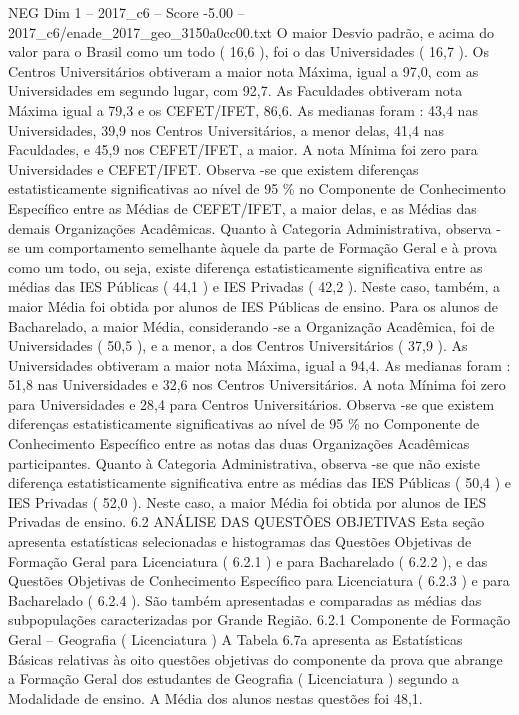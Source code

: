 \begin{textsample}{NEG Dim 1 – 2017\_c6 – Score -5.00 – 2017\_c6/enade\_2017\_geo\_3150a0cc00.txt}
O maior Desvio padrão, e acima do valor para o Brasil como um todo ( 16,6 ), foi o das Universidades ( 16,7 ).
Os Centros Universitários obtiveram a maior nota Máxima, igual a 97,0, com as Universidades em segundo lugar, com 92,7.
As Faculdades obtiveram nota Máxima igual a 79,3 e os CEFET/IFET, 86,6.
As medianas foram : 43,4 nas Universidades, 39,9 nos Centros Universitários, a menor delas, 41,4 nas Faculdades, e 45,9 nos CEFET/IFET, a maior.
A nota Mínima foi zero para Universidades e CEFET/IFET.
Observa -se que existem diferenças estatisticamente significativas ao nível de 95 \% no Componente de Conhecimento Específico entre as Médias de CEFET/IFET, a maior delas, e as Médias das demais Organizações Acadêmicas.
Quanto à Categoria Administrativa, observa -se um comportamento semelhante àquele da parte de Formação Geral e à prova como um todo, ou seja, existe diferença estatisticamente significativa entre as médias das IES Públicas ( 44,1 ) e IES Privadas ( 42,2 ).
Neste caso, também, a maior Média foi obtida por alunos de IES Públicas de ensino.
Para os alunos de Bacharelado, a maior Média, considerando -se a Organização Acadêmica, foi de Universidades ( 50,5 ), e a menor, a dos Centros Universitários ( 37,9 ).
As Universidades obtiveram a maior nota Máxima, igual a 94,4.
As medianas foram : 51,8 nas Universidades e 32,6 nos Centros Universitários.
A nota Mínima foi zero para Universidades e 28,4 para Centros Universitários.
Observa -se que existem diferenças estatisticamente significativas ao nível de 95 \% no Componente de Conhecimento Específico entre as notas das duas Organizações Acadêmicas participantes.
Quanto à Categoria Administrativa, observa -se que não existe diferença estatisticamente significativa entre as médias das IES Públicas ( 50,4 ) e IES Privadas ( 52,0 ).
Neste caso, a maior Média foi obtida por alunos de IES Privadas de ensino. 6.2 ANÁLISE DAS QUESTÕES OBJETIVAS Esta seção apresenta estatísticas selecionadas e histogramas das Questões Objetivas de Formação Geral para Licenciatura ( 6.2.1 ) e para Bacharelado ( 6.2.2 ), e das Questões Objetivas de Conhecimento Específico para Licenciatura ( 6.2.3 ) e para Bacharelado ( 6.2.4 ).
São também apresentadas e comparadas as médias das subpopulações caracterizadas por Grande Região. 6.2.1 Componente de Formação Geral – Geografia ( Licenciatura ) A Tabela 6.7a apresenta as Estatísticas Básicas relativas às oito questões objetivas do componente da prova que abrange a Formação Geral dos estudantes de Geografia ( Licenciatura ) segundo a Modalidade de ensino.
A Média dos alunos nestas questões foi 48,1.

\end{textsample}
